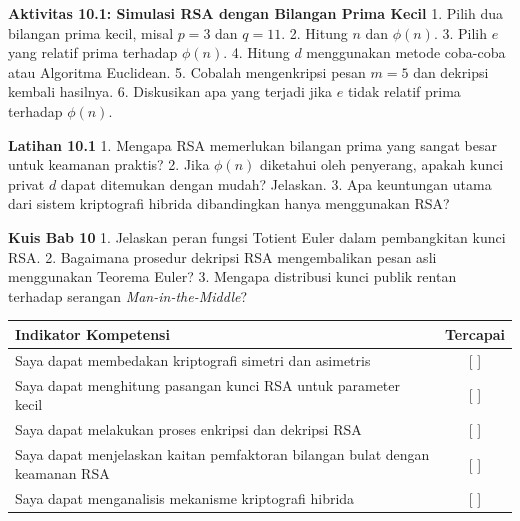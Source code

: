 \documentclass[../main.tex]{subfiles}
\begin{document}
\begin{obeactivity}
\textbf{Aktivitas 10.1: Simulasi RSA dengan Bilangan Prima Kecil}
1. Pilih dua bilangan prima kecil, misal $p=3$ dan $q=11$.
2. Hitung $n$ dan $\phi(n)$.
3. Pilih $e$ yang relatif prima terhadap $\phi(n)$.
4. Hitung $d$ menggunakan metode coba-coba atau Algoritma Euclidean.
5. Cobalah mengenkripsi pesan $m=5$ dan dekripsi kembali hasilnya.
6. Diskusikan apa yang terjadi jika $e$ tidak relatif prima terhadap $\phi(n)$.
\end{obeactivity}

\begin{obereflection}
\textbf{Latihan 10.1}
1. Mengapa RSA memerlukan bilangan prima yang sangat besar untuk keamanan praktis?
2. Jika $\phi(n)$ diketahui oleh penyerang, apakah kunci privat $d$ dapat ditemukan dengan mudah? Jelaskan.
3. Apa keuntungan utama dari sistem kriptografi hibrida dibandingkan hanya menggunakan RSA?
\end{obereflection}

\begin{obeassessment}
\textbf{Kuis Bab 10}
1. Jelaskan peran fungsi Totient Euler dalam pembangkitan kunci RSA.
2. Bagaimana prosedur dekripsi RSA mengembalikan pesan asli menggunakan Teorema Euler?
3. Mengapa distribusi kunci publik rentan terhadap serangan \textit{Man-in-the-Middle}?
\end{obeassessment}

\begin{competencychecklist}
\begin{tabularx}{\linewidth}{|X|c|}
\hline
Indikator Kompetensi & Tercapai \\
\hline
Saya dapat membedakan kriptografi simetri dan asimetris & [ ] \\
\hline
Saya dapat menghitung pasangan kunci RSA untuk parameter kecil & [ ] \\
\hline
Saya dapat melakukan proses enkripsi dan dekripsi RSA & [ ] \\
\hline
Saya dapat menjelaskan kaitan pemfaktoran bilangan bulat dengan keamanan RSA & [ ] \\
\hline
Saya dapat menganalisis mekanisme kriptografi hibrida & [ ] \\
\hline
\end{tabularx}
\end{competencychecklist}
\end{document}
